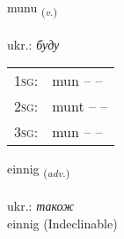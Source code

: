\documentclass[frontgrid, backgrid]{flacards}\usepackage[]{graphicx}\usepackage[]{xcolor}
\begin{document}
\renewcommand{\blhead}{\vskip5pt {\small\bfseries\footnotesize Sagnorð | дієслово }}
\renewcommand{\bcfoot}{\vskip5pt \hspace{2pt}{\small\bfseries\footnotesize 1K}}


{munu \small{\textsubscript{(\textit{v.})}} \\[1ex] %
\textphonetic{[mʏːnʏ]} \\
ukr.: \emph{буду} \\  [2ex]
\renewcommand*{\arraystretch}{0.8}
\begin{tabular}{p{1cm}l}
\textsc{1sg}: & mun --  --  \\ 
\textsc{2sg}: & munt --  --  \\ 
\textsc{3sg}: & mun --  --  \\ 
\end{tabular}
}


\renewcommand{\flhead}{\vskip5pt \fboxsep=0pt {\small\bfseries\footnotesize Atviksorð | прислівник}}
\renewcommand{\fcfoot}{\vskip5pt \fboxsep=0pt \hspace{2pt}{\small\bfseries\footnotesize 1K}}

\renewcommand{\blhead}{\vskip5pt {\small\bfseries\footnotesize Atviksorð | прислівник }}
\renewcommand{\bcfoot}{\vskip5pt \hspace{2pt}{\small\bfseries\footnotesize 1K}}


{einnig \small{\textsubscript{(\textit{adv.})}} \\[1ex]
\textphonetic{[eitnɪɣ]} \\
ukr.: \emph{також} \\  [2ex]
einnig (Indeclinable)}

\renewcommand{\flhead}{\vskip5pt \fboxsep=0pt {\small\bfseries\footnotesize Nafnorð | іменник}}
\renewcommand{\fcfoot}{\vskip5pt \fboxsep=0pt \hspace{2pt}{\small\bfseries\footnotesize 1K}}

\renewcommand{\blhead}{\vskip5pt {\small\bfseries\footnotesize Nafnorð | іменник }}
\renewcommand{\bcfoot}{\vskip5pt \hspace{2pt}{\small\bfseries\footnotesize 1K}}
\end{document}
